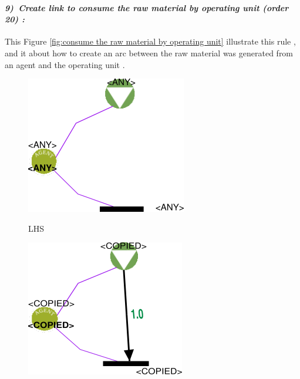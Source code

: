 \vspace{1cm}
\paragraph{\emph{9)~Create link to consume the raw material by operating unit  (order 20) :} }
 
 
This Figure \ref{fig:consume the raw material by operating unit}  illustrate  this rule , and it about how to create an arc between 
the raw material was generated from an agent and the operating unit .

 
\vspace{1cm}
\begin{figure}[th]
\centering
\begin{minipage}{.6\textwidth}
 
  \includegraphics[width=.7\linewidth]{Chapiter3/img/L9}
  \linebreak

\hspace{2.5cm}  LHS
 
  
\end{minipage}%
\begin{minipage}{.6\textwidth}
 
  \includegraphics[width=.7\linewidth]{Chapiter3/img/R9}
\linebreak  


\end{minipage}
\end{figure}
